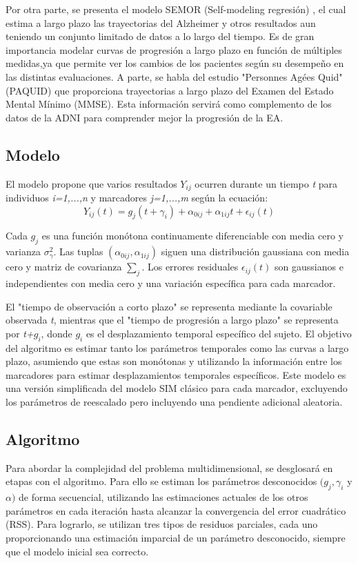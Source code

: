 	Por otra parte, se presenta el modelo SEMOR (Self-modeling regresión) \cite{kneip1988convergence}, el cual estima a largo plazo las trayectorias del Alzheimer y otros resultados aun teniendo un conjunto limitado de datos a lo largo del tiempo. Es de gran importancia modelar curvas de progresión a largo plazo en función de múltiples medidas,ya que permite ver los cambios de los pacientes según su desempeño en las distintas evaluaciones. A parte, se habla del estudio "Personnes Agées Quid" (PAQUID) que proporciona trayectorias a largo plazo del Examen del Estado Mental Mínimo (MMSE). Esta información servirá como complemento de los datos de la ADNI para comprender mejor la progresión de la EA.
	
	\subsection{Modelo}
	El modelo propone que varios resultados $Y_{ij}$ ocurren durante un tiempo \textit{t} para individuos \textit{i=1,...,n} y marcadores \textit{j=1,...,m} según la ecuación:
	\begin{equation}
		Y_{ij}(t)=g_{j}(t+\gamma_{i})+\alpha_{0ij}+\alpha_{1ij}t+\epsilon_{ij}(t)
	\end{equation}
	
	Cada $g_{j}$ es una función monótona continuamente diferenciable con media cero y varianza $\sigma_{\gamma}^{2}$. Las tuplas $(\alpha_{0ij},\alpha_{1ij})$ siguen una distribución gaussiana con media cero y matriz de covarianza $\sum_{j}$. Los errores residuales $\epsilon_{ij}(t)$ son gaussianos e independientes con media cero y una variación específica para cada marcador.
	
	El "tiempo de observación a corto plazo" se representa mediante la covariable observada \textit{t}, mientras que el "tiempo de progresión a largo plazo" se representa por \textit{t+$g_{i}$}, donde $g_{i}$ es el desplazamiento temporal específico del sujeto. El objetivo del algoritmo es estimar tanto los parámetros temporales como las curvas a largo plazo, asumiendo que estas son monótonas y utilizando la información entre los marcadores para estimar desplazamientos temporales específicos. Este modelo es una versión simplificada del modelo SIM clásico para cada marcador, excluyendo los parámetros de reescalado pero incluyendo una pendiente adicional aleatoria.\cite{donohue2014estimating}
	
	\subsection{Algoritmo}
	Para abordar la complejidad del problema multidimensional, se desglosará en etapas con el algoritmo. Para ello se estiman los parámetros desconocidos $(g_{j}, \gamma_{i}$ y $\alpha)$ de forma secuencial, utilizando las estimaciones actuales de los otros parámetros en cada iteración hasta alcanzar la convergencia del error cuadrático (RSS). Para lograrlo, se utilizan tres tipos de residuos parciales, cada uno proporcionando una estimación imparcial de un parámetro desconocido, siempre que el modelo inicial sea correcto.\\
	
